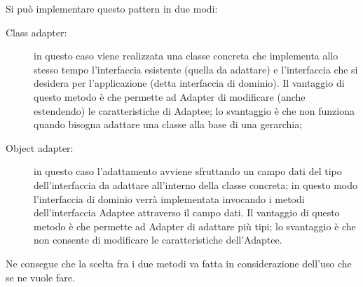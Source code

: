 Si può implementare questo pattern in due modi:
\begin{description}
\item[Class adapter:] in questo caso viene realizzata una classe concreta che implementa allo stesso tempo l'interfaccia esistente (quella da adattare) e l'interfaccia che si desidera per l'applicazione (detta interfaccia di dominio). Il vantaggio di questo metodo è che permette ad Adapter di modificare (anche estendendo) le caratteristiche di Adaptee; lo svantaggio è che non funziona quando bisogna adattare una classe alla base di una gerarchia;
\item[Object adapter:] in questo caso l'adattamento avviene sfruttando un campo dati del tipo dell'interfaccia da adattare all'interno della classe concreta; in questo modo l'interfaccia di dominio verrà implementata invocando i metodi dell'interfaccia Adaptee attraverso il campo dati. Il vantaggio di questo metodo è che permette ad Adapter di adattare più tipi; lo svantaggio è che non consente di modificare le caratteristiche dell'Adaptee.
\end{description}
Ne consegue che la scelta fra i due metodi va fatta in considerazione dell'uso che se ne vuole fare.
